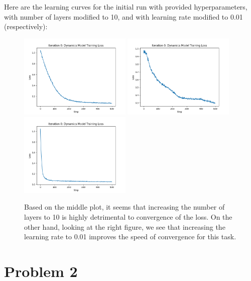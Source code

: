 \documentclass{article} %
\begin{document}
\begin{sol}
  Here are the learning curves for the initial run with provided hyperparameters, with number of layers modified to 10, and with learning rate modified to 0.01 (respectively):
  \begin{figure}[!ht]
    \color{darkblue}
    \begin{center}
    \includegraphics[width=2.1in]{images/q1/itr_0_loss_curve.png}
    \includegraphics[width=2.1in]{images/q1/itr_0_loss_curve_layer10.png}
    \includegraphics[width=2.1in]{images/q1/itr_0_loss_curve_lr0.01.png}
  \end{center}
  \caption{Based on the middle plot, it seems that increasing the number of layers to 10 is highly detrimental to convergence of the loss. On the other hand, looking at the right figure, we see that increasing the learning rate to 0.01 improves the speed of convergence for this task.}
  \end{figure}
\end{sol}

\newpage
\section*{Problem 2}
\end{document}
